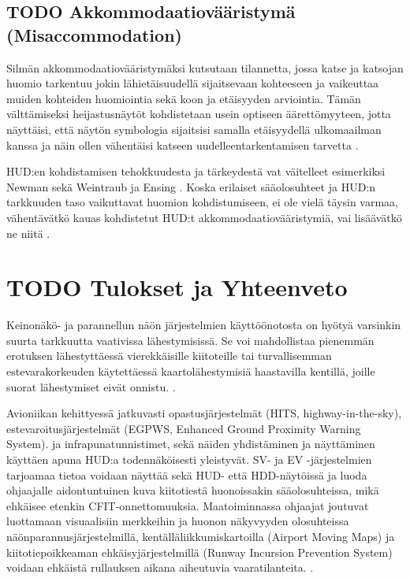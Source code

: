 \documentclass[utf8,bachelor,manualbib]{gradu3}
\begin{document}
\section{TODO Akkommodaatiovääristymä (Misaccommodation)}

Silmän akkommodaatiovääristymäksi kutsutaan tilannetta, jossa katse ja katsojan huomio tarkentuu jokin lähietäisuudellä sijaitsevaan kohteeseen ja vaikeuttaa muiden kohteiden huomiointia sekä koon ja etäisyyden arviointia. Tämän välttämiseksi heijastusnäytöt kohdistetaan usein optiseen äärettömyyteen, jotta näyttäisi, että näytön symbologia sijaitsisi samalla etäisyydellä ulkomaailman kanssa ja näin ollen vähentäisi katseen uudelleentarkentamisen tarvetta \citep{naish1964}.

HUD:en kohdistamisen tehokkuudesta ja tärkeydestä vat väitelleet esimerkiksi Newman \citeyearpar{newman1995} sekä Weintraub ja Ensing \citeyearpar{weintraubensing1992}. Koska erilaiset sääolosuhteet ja HUD:n tarkkuuden taso vaikuttavat huomion kohdistumiseen, ei ole vielä täysin varmaa, vähentävätkö kauas kohdistetut HUD:t akkommodaatiovääristymiä, vai lisäävätkö ne niitä \citep{crawfordneal2006}.

\chapter{TODO Tulokset ja Yhteenveto}

Keinonäkö- ja parannellun näön järjestelmien käyttöönotosta on hyötyä varsinkin suurta tarkkuutta vaativissa lähestymisissä. Se voi mahdollistaa pienemmän erotuksen lähestyttäessä vierekkäisille kiitoteille tai turvallisemman estevarakorkeuden käytettäessä kaartolähestymisiä haastavilla kentillä, joille suorat lähestymiset eivät onnistu. \citep{schnellym2004}.

Avioniikan kehittyessä jatkuvasti opastusjärjestelmät (HITS, highway-in-the-sky), estevaroitusjärjestelmät (EGPWS, Enhanced Ground Proximity Warning System). ja infrapunatunnistimet, sekä näiden yhdistäminen ja näyttäminen käyttäen apuna HUD:a todennäköisesti yleistyvät. SV- ja EV -järjestelmien tarjoamaa tietoa voidaan näyttää sekä HUD- että HDD-näytöissä ja luoda ohjaajalle aidontuntuinen kuva kiitotiestä huonoissakin sääolosuhteissa, mikä ehkäisee etenkin CFIT-onnettomuuksia. Maatoiminnassa ohjaajat joutuvat luottamaan visuaalisiin merkkeihin ja huonon näkyvyyden olosuhteissa näönparannusjärjestelmillä, kentälläliikkumiskartoilla (Airport Moving Maps) ja kiitotiepoikkeaman ehkäisyjärjestelmillä (Runway Incursion Prevention System) voidaan ehkäistä rullauksen aikana aiheutuvia vaaratilanteita. \citep{crawfordneal2006}.
\end{document}
